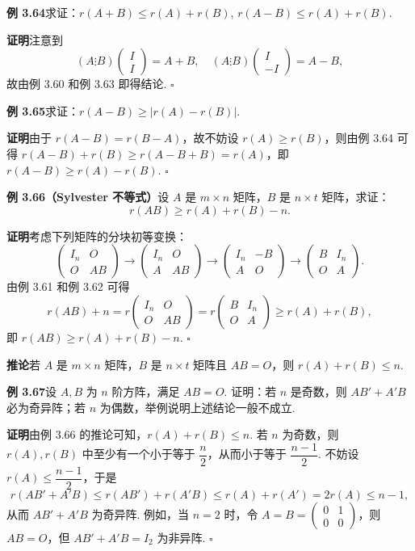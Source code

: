\documentclass[UTF8, 12pt, fontset=fandol, oneside]{ctexart}
\begin{document}
\noindent\textbf{例 3.64}\quad 求证：$r(A+B)\le r(A)+r(B)$, $r(A-B)\le r(A)+r(B)$.

\noindent\textbf{证明}\quad 注意到
\[
(A\vdots B)\begin{pmatrix}I\\I\end{pmatrix}=A+B,\quad
(A\vdots B)\begin{pmatrix}I\\-I\end{pmatrix}=A-B,
\]
故由例 3.60 和例 3.63 即得结论. $\square$

\noindent\textbf{例 3.65}\quad 求证：$r(A-B)\ge |r(A)-r(B)|$.

\noindent\textbf{证明}\quad 由于 $r(A-B)=r(B-A)$，故不妨设 $r(A)\ge r(B)$，则由例 3.64 可得 $r(A-B)+r(B)\ge r(A-B+B)=r(A)$，即 $r(A-B)\ge r(A)-r(B)$. $\square$

\noindent\textbf{例 3.66（Sylvester 不等式）}\quad 设 $A$ 是 $m\times n$ 矩阵，$B$ 是 $n\times t$ 矩阵，求证：
\[
r(AB)\ge r(A)+r(B)-n.
\]

\noindent\textbf{证明}\quad 考虑下列矩阵的分块初等变换：
\[
\begin{pmatrix}I_n&O\\O&AB\end{pmatrix}
\to
\begin{pmatrix}I_n&O\\A&AB\end{pmatrix}
\to
\begin{pmatrix}I_n&-B\\A&O\end{pmatrix}
\to
\begin{pmatrix}B&I_n\\O&A\end{pmatrix}.
\]
由例 3.61 和例 3.62 可得
\[
r(AB)+n=r\begin{pmatrix}I_n&O\\O&AB\end{pmatrix}
=r\begin{pmatrix}B&I_n\\O&A\end{pmatrix}\ge r(A)+r(B),
\]
即 $r(AB)\ge r(A)+r(B)-n$. $\square$

\noindent\textbf{推论}\quad 若 $A$ 是 $m\times n$ 矩阵，$B$ 是 $n\times t$ 矩阵且 $AB=O$，则 $r(A)+r(B)\le n$.

\noindent\textbf{例 3.67}\quad 设 $A,B$ 为 $n$ 阶方阵，满足 $AB=O$. 证明：若 $n$ 是奇数，则 $AB'+A'B$ 必为奇异阵；若 $n$ 为偶数，举例说明上述结论一般不成立.

\noindent\textbf{证明}\quad 由例 3.66 的推论可知，$r(A)+r(B)\le n$. 若 $n$ 为奇数，则 $r(A),r(B)$ 中至少有一个小于等于 $\dfrac{n}{2}$，从而小于等于 $\dfrac{n-1}{2}$. 不妨设 $r(A)\le\dfrac{n-1}{2}$，于是
\[
r(AB'+A'B)\le r(AB')+r(A'B)\le r(A)+r(A')=2r(A)\le n-1,
\]
从而 $AB'+A'B$ 为奇异阵. 例如，当 $n=2$ 时，令 $A=B=\begin{pmatrix}0&1\\0&0\end{pmatrix}$，则 $AB=O$，但 $AB'+A'B=I_2$ 为非异阵. $\square$
\end{document}

